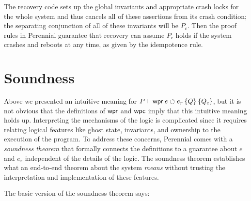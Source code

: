 The recovery code sets up the global invariants and appropriate crash locks for
the whole system and thus cancels all of these assertions from its crash
condition; the separating conjunction of all of these invariants will be
$P_{c}$. Then the proof rules in Perennial guarantee that recovery can assume
$P_{c}$ holds if the system crashes and reboots at any time, as given by the
idempotence rule.

\section{Soundness}

Above we presented an intuitive meaning for $P \proves \wpr{e}{e_{r}}{Q}{Q_{c}}$, but it is
not obvious that the definitions of $\textsf{\upshape wpr}$ and $\textsf{\upshape wpc}$ imply that this
intuitive meaning holds up. Interpreting the mechanisms of the logic is
complicated since it requires relating logical features like ghost state,
invariants, and ownership to the execution of the program. To address these
concerns, Perennial comes with a \emph{soundness theorem} that formally connects
the definitions to a guarantee about $e$ and $e_{r}$ independent of the details
of the logic. The soundness theorem establishes what an end-to-end theorem about
the system \emph{means} without trusting the interpretation and implementation
of these features.

The basic version of the soundness theorem says:

\newcommand{\bigast}{\mathop{\scalebox{3}{\raisebox{-0.3ex}{$\ast$}}}}

